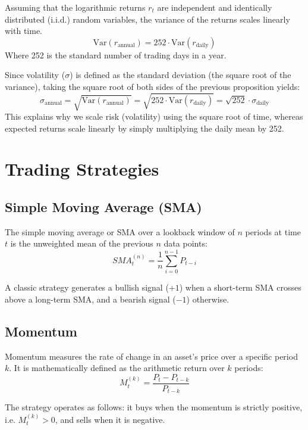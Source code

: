 \begin{proposition}
Assuming that the logarithmic returns \(r_t\) are independent and identically distributed (i.i.d.) random variables, the variance of the returns scales linearly with time.
\[ 
     \text{Var}(r_{\text{annual}}) = 252 \cdot \text{Var}(r_{\text{daily}})
\]
Where 252 is the standard number of trading days in a year.
\end{proposition}

\begin{remark}
Since volatility (\(\sigma\)) is defined as the standard deviation (the square root of the variance), taking the square root of both sides of the previous proposition yields:
\[ 
     \sigma_{\text{annual}} = \sqrt{\text{Var}(r_{\text{annual}})} = \sqrt{252 \cdot \text{Var}(r_{\text{daily}})} = \sqrt{252} \cdot \sigma_{\text{daily}} 
\]
This explains why we scale risk (volatility) using the square root of time, whereas expected returns scale linearly by simply multiplying the daily mean by 252.
\end{remark}

\section{Trading Strategies}

\subsection{Simple Moving Average (SMA)}

\begin{definition}
The simple moving average or SMA over a lookback window of \(n\) periods at time \(t\) is the unweighted mean of the previous \(n\) data points:
\[ 
    SMA_t^{(n)} = \frac{1}{n} \sum_{i=0}^{n-1} P_{t-i}
\]
\end{definition}
\begin{remark}
    A classic strategy generates a bullish signal (\(+1\)) when a short-term SMA crosses above a long-term SMA, and a bearish signal (\(-1\)) otherwise.
    
\end{remark}

\subsection{Momentum}

\begin{definition}[Momentum]
Momentum measures the rate of change in an asset's price over a specific period \(k\). It is mathematically defined as the arithmetic return over \(k\) periods:
\[ 
    M_t^{(k)} = \frac{P_t - P_{t-k}}{P_{t-k}} 
\]
\begin{remark}
The strategy operates as follows: it buys when the momentum is strictly positive, i.e. \(M_t^{(k)} > 0\), and sells when it is negative.
\end{remark}
\end{definition}

